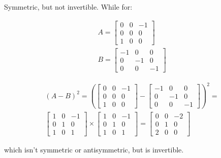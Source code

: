 \documentclass[11pt]{article}
\begin{document}
Symmetric, but not invertible.  While for:

\begin{align*}
  A = \begin{bmatrix}
    0 & 0 & -1 \\
    0 & 0 & 0 \\
    1 & 0 & 0
  \end{bmatrix} \\
  B = \begin{bmatrix}
    -1 & 0  & 0 \\
    0  & -1 & 0 \\
    0  & 0  & -1
  \end{bmatrix}
\end{align*}


\begin{align*}
  (A - B)^2 = \left(\begin{bmatrix}
    0 & 0 & -1 \\
    0 & 0 & 0 \\
    1 & 0 & 0
  \end{bmatrix} -
  \begin{bmatrix}
    -1 & 0  & 0 \\
    0  & -1 & 0 \\
    0  & 0  & -1
  \end{bmatrix} \right)^2 = \\
  \begin{bmatrix}
    1 & 0 & -1 \\
    0 & 1 & 0 \\
    1 & 0 & 1
  \end{bmatrix} \times 
  \begin{bmatrix}
    1 & 0 & -1 \\
    0 & 1 & 0 \\
    1 & 0 & 1
  \end{bmatrix} = 
  \begin{bmatrix}
    0 & 0 & -2 \\
    0 & 1 & 0 \\
    2 & 0 & 0
  \end{bmatrix}
\end{align*}

which isn't symmetric or antisymmetric, but is invertible.
\end{document}
